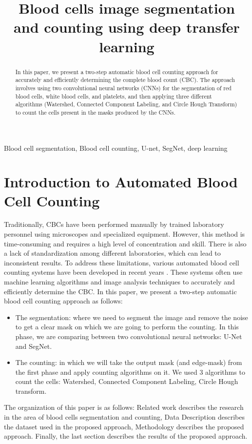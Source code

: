 \documentclass[conference]{IEEEtran}
\begin{document}
\title{Blood cells image segmentation and counting using deep transfer learning}
\author{
}
\maketitle
\begin{abstract}
In this paper, we present a two-step automatic blood cell counting approach for accurately and efficiently determining the complete blood count (CBC). The approach involves using two convolutional neural networks (CNNs) for the segmentation of red blood cells, white blood cells, and platelets, and then applying three different algorithms (Watershed, Connected Component Labeling, and Circle Hough Transform) to count the cells present in the masks produced by the CNNs.
\end{abstract}
\begin{IEEEkeywords}
Blood cell segmentation, Blood cell counting, U-net, SegNet, deep learning
\end{IEEEkeywords}

\section{Introduction to Automated Blood Cell Counting}
Traditionally, CBCs have been performed manually by trained laboratory personnel using microscopes and specialized equipment. However, this method is time-consuming and requires a high level of concentration and skill. There is also a lack of standardization among different laboratories, which can lead to inconsistent results.
To address these limitations, various automated blood cell counting systems have been developed in recent years \cite{ref1}. These systems often use machine learning algorithms and image analysis techniques to accurately and efficiently determine the CBC.
In this paper, we present a two-step automatic blood cell counting approach as follows: 
\begin{itemize}
\item The segmentation: where we need to segment the image and remove the noise to get a clear mask on which we are going to perform the counting. In this phase, we are comparing between two convolutional neural networks: U-Net and SegNet.
\item The counting: in which we will take the output mask (and edge-mask) from the first phase and apply counting algorithms on it. We used 3 algorithms to count the cells: Watershed, Connected Component Labeling, Circle Hough transform.
\end{itemize}
The organization of this paper is as follows: Related work describes the research in the area of blood cells segmentation and counting, Data Description describes the dataset used in the proposed approach, Methodology describes the proposed approach. Finally, the last section describes the results of the proposed approach.
\end{document}
